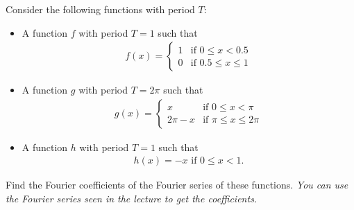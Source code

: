 \documentclass[11pt]{article}
\begin{document}






\begin{exercise}
    Consider the following functions with period $T$:
    \begin{itemize}
        \item A function $f$ with period $T = 1$ such that 
        \begin{align*}
            f(x) = 
            \left\{\begin{array}{ll}
                1 & \text{if } 0 \leq x < 0.5 \\
                0 & \text{if } 0.5 \leq x \leq 1
            \end{array}\right.
        \end{align*}
        \item A function $g$ with period $T = 2\pi$ such that 
        \begin{align*}
            g(x) = 
            \left\{\begin{array}{ll}
                x & \text{if } 0 \leq x < \pi \\
                2\pi - x & \text{if } \pi \leq x \leq 2\pi
            \end{array}\right.
        \end{align*}
        \item A function $h$ with period $T = 1$ such that 
        \begin{align*}
            h(x) = -x \text{ if } 0 \leq x < 1.
        \end{align*}
    \end{itemize}
    Find the Fourier coefficients of the Fourier series of these functions. 
    \textit{You can use the Fourier series seen in the lecture to get the coefficients.}
\end{exercise}
\end{document}
